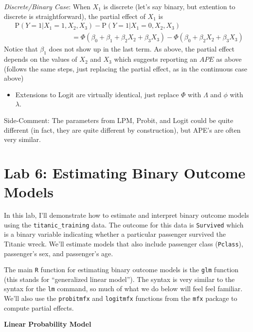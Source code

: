 \documentclass[
  letterpaper,
  DIV=11,
  numbers=noendperiod]{scrreprt}
\providecommand{\tightlist}{%
  \setlength{\itemsep}{0pt}\setlength{\parskip}{0pt}}\usepackage{longtable,booktabs,array}
\begin{document}
\emph{Discrete/Binary Case}: When \(X_1\) is discrete (let's say binary,
but extention to discrete is straightforward), the partial effect of
\(X_1\) is \begin{align*}
  & \mathrm{P}(Y=1|X_1=1, X_2, X_3) - \mathrm{P}(Y=1|X_1=0, X_2, X_3) \\
  &\hspace{100pt} = \Phi(\beta_0 + \beta_1 + \beta_2 X_2 + \beta_3 X_3) - \Phi(\beta_0 + \beta_2 X_2 + \beta_3 X_3)
\end{align*} Notice that \(\beta_1\) does not show up in the last term.
As above, the partial effect depends on the values of \(X_2\) and
\(X_3\) which suggests reporting an \(APE\) as above (follows the same
steps, just replacing the partial effect, as in the continuous case
above)

\begin{itemize}
\tightlist
\item
  Extensions to Logit are virtually identical, just replace \(\Phi\)
  with \(\Lambda\) and \(\phi\) with \(\lambda\).
\end{itemize}

{Side-Comment:} The parameters from LPM, Probit, and Logit could be
quite different (in fact, they are quite different by construction), but
APE's are often very similar.

\section{Lab 6: Estimating Binary Outcome
Models}\label{lab-6-estimating-binary-outcome-models}

In this lab, I'll demonstrate how to estimate and interpret binary
outcome models using the \texttt{titanic\_training} data. The outcome
for this data is \texttt{Survived} which is a binary variable indicating
whether a particular passenger survived the Titanic wreck. We'll
estimate models that also include passenger class (\texttt{Pclass}),
passenger's sex, and passenger's age.

The main \texttt{R} function for estimating binary outcome models is the
\texttt{glm} function (this stands for ``generalized linear model'').
The syntax is very similar to the syntax for the \texttt{lm} command, so
much of what we do below will feel feel familiar. We'll also use the
\texttt{probitmfx} and \texttt{logitmfx} functions from the \texttt{mfx}
package to compute partial effects.

\textbf{Linear Probability Model}
\end{document}
